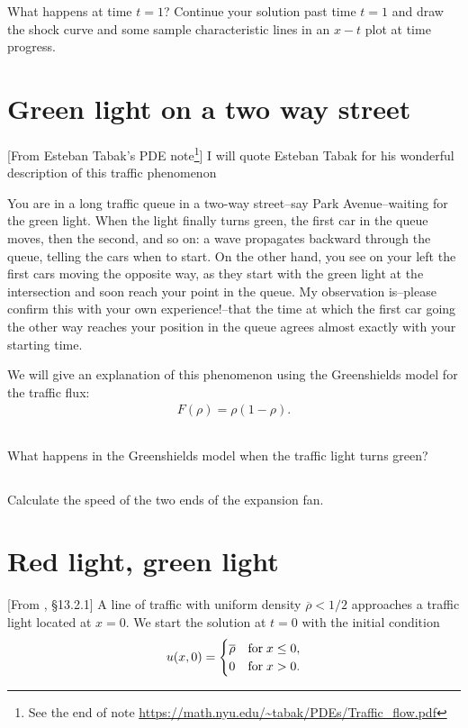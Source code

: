 \documentclass[11pt,letterpaper]{report}
\begin{document}
What happens at time $t=1$? Continue your solution past time $t=1$ and draw the shock curve and some sample characteristic lines in an $x-t$ plot at time progress. 

\section{Green light on a two way street}
[From Esteban Tabak's PDE note\footnote{See the end of note \url{https://math.nyu.edu/~tabak/PDEs/Traffic_flow.pdf}}] I will quote Esteban Tabak for his wonderful description of this traffic phenomenon
\begin{displayquote}
    You are in a long traffic queue in a two-way street--say Park Avenue--waiting for the green light. When the light finally turns green, the first car in the queue moves, then the second, and so on: a wave propagates backward through the queue, telling the cars when to start. On the other hand, you see on your left the first cars moving the opposite way, as they start with the green light at the intersection and soon reach your point in the queue. My observation is--please confirm this with your own experience!--that the time at which the first car going the other way reaches your position in the queue agrees almost exactly with your starting time. 
\end{displayquote}
We will give an explanation of this phenomenon using the Greenshields model for the traffic flux:
\begin{align}
    F(\rho) = \rho(1-\rho).
\end{align}

\subsection{}
What happens in the Greenshields model when the traffic light turns green?

\subsection{}
Calculate the speed of the two ends of the expansion fan.

\section{Red light, green light}
[From \cite{ShearerLevy_15}, \S 13.2.1] A line of traffic with uniform density $\overline{\rho}<1/2$ approaches a traffic light located at $x=0$. We start the solution at $t=0$ with the initial condition
\begin{align}
    u(x,0) = \begin{cases}
        \overline{\rho} & \text{for\;} x\leq 0,\\
        0 & \text{for\;} x>0.
    \end{cases}
\end{align}
\end{document}
